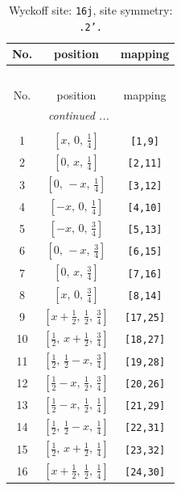 \documentclass[fleqn,8pt]{jsarticle}
\begin{document}
\renewcommand{\arraystretch}{1.2}
\begin{longtable}{ccc}
\caption{Wyckoff site: {\tt 16j}, site symmetry: {\tt .2'.}}
 \\
 \hline \hline
No. & position & mapping \\ \hline \endfirsthead

\multicolumn{2}{l}{\tablename\ \thetable{}} \\
 \hline \hline
No. & position & mapping \\ \hline \endhead

 \hline \hline
\multicolumn{2}{r}{\footnotesize\it continued ...} \\ \endfoot

 \hline \hline
\multicolumn{2}{r}{} \\ \endlastfoot

1 & $\left[ x,\, 0,\, \frac{1}{4} \right]$ & {\tt [1,9]} \\ \hline
2 & $\left[ 0,\, x,\, \frac{1}{4} \right]$ & {\tt [2,11]} \\ \hline
3 & $\left[ 0,\, - x,\, \frac{1}{4} \right]$ & {\tt [3,12]} \\ \hline
4 & $\left[ - x,\, 0,\, \frac{1}{4} \right]$ & {\tt [4,10]} \\ \hline
5 & $\left[ - x,\, 0,\, \frac{3}{4} \right]$ & {\tt [5,13]} \\ \hline
6 & $\left[ 0,\, - x,\, \frac{3}{4} \right]$ & {\tt [6,15]} \\ \hline
7 & $\left[ 0,\, x,\, \frac{3}{4} \right]$ & {\tt [7,16]} \\ \hline
8 & $\left[ x,\, 0,\, \frac{3}{4} \right]$ & {\tt [8,14]} \\ \hline
9 & $\left[ x + \frac{1}{2},\, \frac{1}{2},\, \frac{3}{4} \right]$ & {\tt [17,25]} \\ \hline
10 & $\left[ \frac{1}{2},\, x + \frac{1}{2},\, \frac{3}{4} \right]$ & {\tt [18,27]} \\ \hline
11 & $\left[ \frac{1}{2},\, \frac{1}{2} - x,\, \frac{3}{4} \right]$ & {\tt [19,28]} \\ \hline
12 & $\left[ \frac{1}{2} - x,\, \frac{1}{2},\, \frac{3}{4} \right]$ & {\tt [20,26]} \\ \hline
13 & $\left[ \frac{1}{2} - x,\, \frac{1}{2},\, \frac{1}{4} \right]$ & {\tt [21,29]} \\ \hline
14 & $\left[ \frac{1}{2},\, \frac{1}{2} - x,\, \frac{1}{4} \right]$ & {\tt [22,31]} \\ \hline
15 & $\left[ \frac{1}{2},\, x + \frac{1}{2},\, \frac{1}{4} \right]$ & {\tt [23,32]} \\ \hline
16 & $\left[ x + \frac{1}{2},\, \frac{1}{2},\, \frac{1}{4} \right]$ & {\tt [24,30]} \\
\end{longtable}
\end{document}
